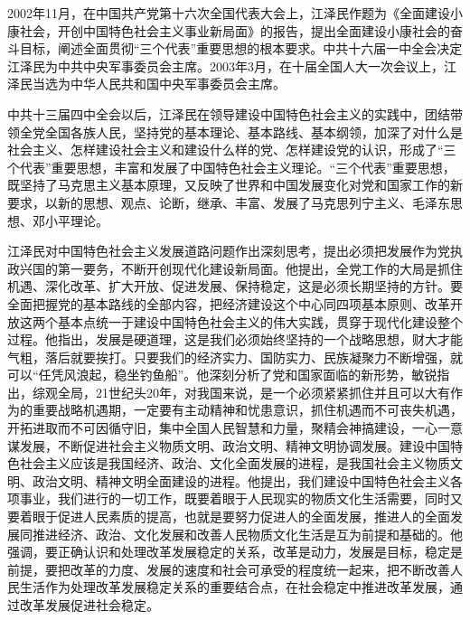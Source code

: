 \documentclass[UTF8, 11pt, oneside]{ctexart}
\begin{document}
2002年11月，在中国共产党第十六次全国代表大会上，江泽民作题为《全面建设小康社会，开创中国特色社会主义事业新局面》的报告，提出全面建设小康社会的奋斗目标，阐述全面贯彻“三个代表”重要思想的根本要求。中共十六届一中全会决定江泽民为中共中央军事委员会主席。2003年3月，在十届全国人大一次会议上，江泽民当选为中华人民共和国中央军事委员会主席。

中共十三届四中全会以后，江泽民在领导建设中国特色社会主义的实践中，团结带领全党全国各族人民，坚持党的基本理论、基本路线、基本纲领，加深了对什么是社会主义、怎样建设社会主义和建设什么样的党、怎样建设党的认识，形成了“三个代表”重要思想，丰富和发展了中国特色社会主义理论。“三个代表”重要思想，既坚持了马克思主义基本原理，又反映了世界和中国发展变化对党和国家工作的新要求，以新的思想、观点、论断，继承、丰富、发展了马克思列宁主义、毛泽东思想、邓小平理论。

江泽民对中国特色社会主义发展道路问题作出深刻思考，提出必须把发展作为党执政兴国的第一要务，不断开创现代化建设新局面。他提出，全党工作的大局是抓住机遇、深化改革、扩大开放、促进发展、保持稳定，这是必须长期坚持的方针。要全面把握党的基本路线的全部内容，把经济建设这个中心同四项基本原则、改革开放这两个基本点统一于建设中国特色社会主义的伟大实践，贯穿于现代化建设整个过程。他指出，发展是硬道理，这是我们必须始终坚持的一个战略思想，财大才能气粗，落后就要挨打。只要我们的经济实力、国防实力、民族凝聚力不断增强，就可以“任凭风浪起，稳坐钓鱼船”。他深刻分析了党和国家面临的新形势，敏锐指出，综观全局，21世纪头20年，对我国来说，是一个必须紧紧抓住并且可以大有作为的重要战略机遇期，一定要有主动精神和忧患意识，抓住机遇而不可丧失机遇，开拓进取而不可因循守旧，集中全国人民智慧和力量，聚精会神搞建设，一心一意谋发展，不断促进社会主义物质文明、政治文明、精神文明协调发展。建设中国特色社会主义应该是我国经济、政治、文化全面发展的进程，是我国社会主义物质文明、政治文明、精神文明全面建设的进程。他提出，我们建设中国特色社会主义各项事业，我们进行的一切工作，既要着眼于人民现实的物质文化生活需要，同时又要着眼于促进人民素质的提高，也就是要努力促进人的全面发展，推进人的全面发展同推进经济、政治、文化发展和改善人民物质文化生活是互为前提和基础的。他强调，要正确认识和处理改革发展稳定的关系，改革是动力，发展是目标，稳定是前提，要把改革的力度、发展的速度和社会可承受的程度统一起来，把不断改善人民生活作为处理改革发展稳定关系的重要结合点，在社会稳定中推进改革发展，通过改革发展促进社会稳定。
\end{document}
